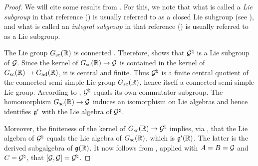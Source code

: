 \documentclass{article}
\theoremstyle{definition}
\numberwithin{equation}{section}
\renewcommand{\-}{\hyp{}}
\begin{document}
\begin{proof}
	We will cite some results from \cite{BourLie1-3}. For this, we note that what is called a \emph{Lie subgroup} in that reference (\cite[Chapter III, \S1, no. 3, Definition 3]{BourLie1-3}) is usually referred to as a closed Lie subgroup (see \cite[Chapter III, \S1, no. 3, Proposition 5]{BourLie1-3}), and what is called an \emph{integral subgroup} in that reference (\cite[Chapter III, \S6, no. 2, Definition 1]{BourLie1-3}) is usually referred to as a Lie subgroup.

	The Lie group $G_{\textrm{sc}}(\mathbb{R})$ is connected \cite[\S7.2, Proposition 7.6]{PR94}. Therefore, \cite[Chapter III, \S3, no. 2, Corollary 1]{BourLie1-3} shows that $\mathcal{G}^\natural$ is a Lie subgroup of $\mathcal{G}$. Since the kernel of $G_{\textrm{sc}}(\mathbb{R}) \to \mathcal{G}$ is contained in the kernel of $G_{\textrm{sc}}(\mathbb{R}) \to G_{\textrm{ad}}(\mathbb{R})$, it is central and finite. Thus $\mathcal{G}^\natural$ is a finite central quotient of the connected semi-simple Lie group $G_{\textrm{sc}}(\mathbb{R})$, hence itself a connected semi-simple Lie group. According to \cite[Chapter III, \S9, no. 8, Proposition 29]{BourLie1-3}, $\mathcal{G}^\natural$ equals its own commutator subgroup. The homomorphism $G_{\textrm{sc}}(\mathbb{R}) \to \mathcal{G}$ induces an isomorphism on Lie algebras and hence identifies $\mathfrak{g}'$ with the Lie algebra of $\mathcal{G}^\natural$.
	
	Moreover, the finiteness of the kernel of $G_{\textrm{sc}}(\mathbb{R}) \to \mathcal{G}^\natural$ implies, via \cite[Chapter III, \S3, no. 2, Corollary 1]{BourLie1-3}, that the Lie algebra of $\mathcal{G}^\natural$ equals the Lie algebra of $G_{\textrm{sc}}(\mathbb{R})$, which is $\mathfrak{g}'(\mathbb{R})$. The latter is the derived subgalgebra of $\mathfrak{g}(\mathbb{R})$. It now follows from \cite[Chapter III, \S9, no. 2, Proposition 4]{BourLie1-3}, applied with $A=B=\mathcal{G}$ and $C=\mathcal{G}^\natural$, that $[\mathcal{G},\mathcal{G}]=\mathcal{G}^\natural$.


\end{proof}
\end{document}
